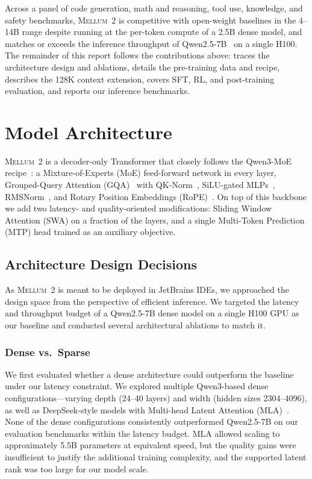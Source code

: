 \documentclass{llmxive}
\providecommand{\modelname}{\textsc{Mellum~2}\xspace}
\begin{document}
Across a panel of code generation, math and reasoning, tool use, knowledge,
and safety benchmarks, \modelname is competitive with open-weight baselines
in the 4--14B range despite running at the per-token compute of a 2.5B dense
model, and matches or exceeds the inference throughput of Qwen2.5-7B~\cite{qwen2.5} on a
single H100. The remainder of this report follows the contributions above:
 traces the architecture design and ablations,
 details the pre-training data and recipe,
 describes the 128K context extension,
 covers SFT, RL, and post-training evaluation, and
 reports our inference benchmarks.

\section{Model Architecture}
\label{sec:architecture}

\modelname is a decoder-only Transformer that closely follows the Qwen3-MoE
recipe~\cite{yang2025qwen3}: a Mixture-of-Experts (MoE) feed-forward network in
every layer, Grouped-Query Attention (GQA)~\cite{ainslie2023gqa} with QK-Norm~\cite{henry2020qknorm},
SiLU-gated MLPs~\cite{shazeer2020glu}, RMSNorm~\cite{zhang2019rmsnorm}, and Rotary Position Embeddings (RoPE)~\cite{su2024roformer}.
On top of this backbone we add two latency- and quality-oriented modifications:
Sliding Window Attention (SWA) on a fraction of the layers, and a single
Multi-Token Prediction (MTP) head trained as an auxiliary objective.

\subsection{Architecture Design Decisions}
\label{sec:arch-decisions}

As \modelname is meant to be deployed in JetBrains IDEs, we approached the design space
from the perspective of efficient inference. We targeted the latency and throughput 
budget of a Qwen2.5-7B dense model on a single H100 GPU as our baseline and conducted
several architectural ablations to match it.

\subsubsection{Dense vs.\ Sparse}

We first evaluated whether a dense architecture could outperform the baseline
under our latency constraint. We explored multiple Qwen3-based dense
configurations---varying depth (24--40 layers) and width (hidden sizes 2304--4096),
as well as DeepSeek-style models with Multi-head Latent Attention
(MLA)~\cite{deepseekai2024deepseekv2}. None of the dense configurations
consistently outperformed Qwen2.5-7B on our evaluation benchmarks within the
latency budget. MLA allowed scaling to approximately 5.5B parameters at
equivalent speed, but the quality gains were insufficient to justify the
additional training complexity, and the supported latent rank was too large
for our model scale.
\end{document}
